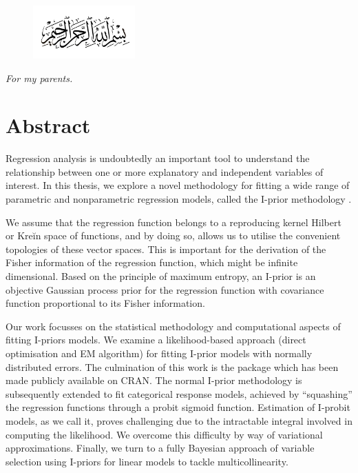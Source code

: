 \documentclass[11pt,twoside,openright,showframe]{report}
\begin{document}
\vspace*{5mm}
\begin{figure}[H]
  \centering
  \includegraphics[width=0.35\textwidth]{figure/bismillah}
\end{figure}
\vspace*{0.75cm}
\begin{center}
  \textit{For my parents.}
\end{center}

\chapter*{Abstract}

Regression analysis is undoubtedly an important tool to understand the relationship between one or more explanatory and independent variables of interest. 
In this thesis, we explore a novel methodology for fitting a wide range of parametric and nonparametric regression models, called the I-prior methodology \citep{bergsma2017}.

We assume that the regression function belongs to a reproducing kernel Hilbert or Kreĭn space of functions, and by doing so, allows us to utilise the convenient topologies of these vector spaces. 
This is important for the derivation of the Fisher information of the regression function, which might be infinite dimensional.
Based on the principle of maximum entropy, an I-prior is an objective Gaussian process prior for the regression function with covariance function proportional to its Fisher information. 

Our work focusses on the statistical methodology and computational aspects of fitting I-priors models. 
We examine a likelihood-based approach (direct optimisation and EM algorithm) for fitting I-prior models with normally distributed errors.
The culmination of this work is the  package  \citep{jamil2017iprior} which has been made publicly available on CRAN. 
The normal I-prior methodology is subsequently extended to fit categorical response models, achieved by ``squashing'' the regression functions through a probit sigmoid function.
Estimation of I-probit models, as we call it, proves challenging due to the intractable integral involved in computing the likelihood. 
We overcome this difficulty by way of variational approximations.
Finally, we turn to a fully Bayesian approach of variable selection using I-priors for linear models to tackle multicollinearity.
\end{document}
